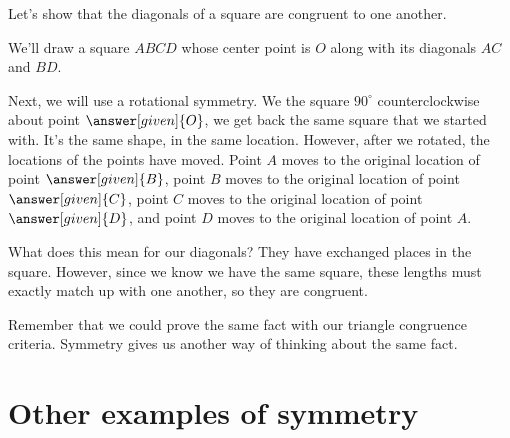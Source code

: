 \documentclass{ximera}
\begin{document}
\begin{example}
Let's show that the diagonals of a square are congruent to one another. 

We'll draw a square $ABCD$ whose center point is $O$ along with its diagonals $AC$ and $BD$.
\begin{image}
\end{image}

Next, we will use a rotational symmetry.  We  the square $90^{\circ}$ counterclockwise about point $\answer[given]{O}$, we get back the same square that we started with. It's the same shape, in the same location. However, after we rotated, the locations of the points have moved. Point $A$ moves to the original location of point $\answer[given]{B}$, point $B$ moves to the original location of point $\answer[given]{C}$, point $C$ moves to the original location of point $\answer[given]{D}$, and point $D$ moves to the original location of point $A$.

\begin{image}
\end{image}

What does this mean for our diagonals? They have exchanged places in the square. However, since we know we have the same square, these lengths must exactly match up with one another, so they are congruent.

\end{example}

Remember that we could prove the same fact with our triangle congruence criteria. Symmetry gives us another way of thinking about the same fact.



\section{Other examples of symmetry}
\end{document}
